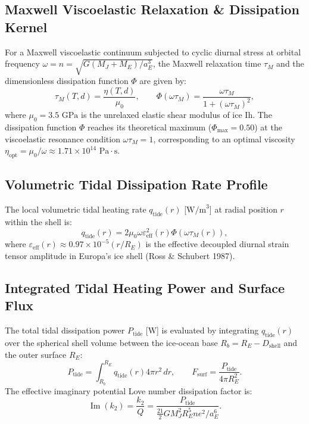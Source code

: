 \documentclass[11pt,a4paper]{article}
\begin{document}
\subsection{Maxwell Viscoelastic Relaxation \& Dissipation Kernel}
For a Maxwell viscoelastic continuum subjected to cyclic diurnal stress at orbital frequency $\omega = n = \sqrt{G(M_J + M_E)/a_E^3}$, the Maxwell relaxation time $\tau_M$ and the dimensionless dissipation function $\Phi$ are given by:
\begin{equation}
\tau_M(T, d) = \frac{\eta(T, d)}{\mu_0}, \qquad \Phi(\omega \tau_M) = \frac{\omega \tau_M}{1 + (\omega \tau_M)^2},
\label{eq:maxwell}
\end{equation}
where $\mu_0 = 3.5\text{ GPa}$ is the unrelaxed elastic shear modulus of ice Ih. The dissipation function $\Phi$ reaches its theoretical maximum ($\Phi_{\max} = 0.50$) at the viscoelastic resonance condition $\omega \tau_M = 1$, corresponding to an optimal viscosity $\eta_{\mathrm{opt}} = \mu_0 / \omega \approx 1.71 \times 10^{14}\text{ Pa}\cdot\text{s}$.

\subsection{Volumetric Tidal Dissipation Rate Profile}
The local volumetric tidal heating rate $q_{\mathrm{tide}}(r)$ [$\text{W/m}^3$] at radial position $r$ within the shell is:
\begin{equation}
q_{\mathrm{tide}}(r) = 2 \mu_0 \omega \varepsilon_{\mathrm{eff}}^2(r) \Phi(\omega \tau_M(r)),
\label{eq:q_tide}
\end{equation}
where $\varepsilon_{\mathrm{eff}}(r) \approx 0.97 \times 10^{-5} (r / R_E)$ is the effective decoupled diurnal strain tensor amplitude in Europa's ice shell (Ross \& Schubert 1987).

\subsection{Integrated Tidal Heating Power and Surface Flux}
The total tidal dissipation power $P_{\mathrm{tide}}$ [$\text{W}$] is evaluated by integrating $q_{\mathrm{tide}}(r)$ over the spherical shell volume between the ice-ocean base $R_b = R_E - D_{\mathrm{shell}}$ and the outer surface $R_E$:
\begin{equation}
P_{\mathrm{tide}} = \int_{R_b}^{R_E} q_{\mathrm{tide}}(r) 4\pi r^2 \, dr, \qquad F_{\mathrm{surf}} = \frac{P_{\mathrm{tide}}}{4\pi R_E^2}.
\label{eq:power_integral}
\end{equation}
The effective imaginary potential Love number dissipation factor is:
\begin{equation}
\operatorname{Im}(k_2) = \frac{k_2}{Q} = \frac{P_{\mathrm{tide}}}{\frac{21}{2} G M_J^2 R_E^5 n e^2 / a_E^6}.
\label{eq:im_k2}
\end{equation}
\end{document}
